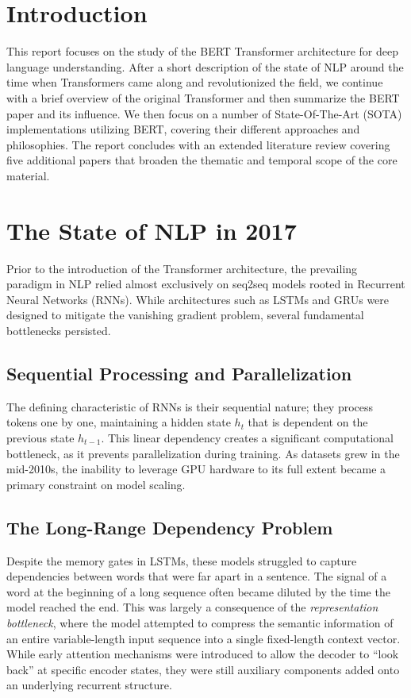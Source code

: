 \documentclass[a4paper,12pt]{article}
\begin{document}

\newpage
\tableofcontents

\clearpage
\section{Introduction}
This report focuses on the study of the BERT Transformer architecture for deep language understanding. After a short description of the state of NLP around the time when Transformers came along and revolutionized the field, we continue with a brief overview of the original Transformer \citep{vaswani2017attention} and then summarize the BERT paper \citep{devlin2019bert} and its influence. We then focus on a number of State-Of-The-Art (SOTA) implementations utilizing BERT, covering their different approaches and philosophies. The report concludes with an extended literature review covering five additional papers that broaden the thematic and temporal scope of the core material.

\section{The State of NLP in 2017}
Prior to the introduction of the Transformer architecture, the prevailing paradigm in NLP relied almost exclusively on seq2seq models rooted in Recurrent Neural Networks (RNNs). While architectures such as LSTMs \citep{hochreiter1997long} and GRUs were designed to mitigate the vanishing gradient problem, several fundamental bottlenecks persisted.

\subsection{Sequential Processing and Parallelization}
The defining characteristic of RNNs is their sequential nature; they process tokens one by one, maintaining a hidden state $h_t$ that is dependent on the previous state $h_{t-1}$. This linear dependency creates a significant computational bottleneck, as it prevents parallelization during training. As datasets grew in the mid-2010s, the inability to leverage GPU hardware to its full extent became a primary constraint on model scaling.

\subsection{The Long-Range Dependency Problem}
Despite the memory gates in LSTMs, these models struggled to capture dependencies between words that were far apart in a sentence. The signal of a word at the beginning of a long sequence often became diluted by the time the model reached the end. This was largely a consequence of the \textit{representation bottleneck}, where the model attempted to compress the semantic information of an entire variable-length input sequence into a single fixed-length context vector. While early attention mechanisms \citep{bahdanau2014neural} were introduced to allow the decoder to ``look back'' at specific encoder states, they were still auxiliary components added onto an underlying recurrent structure.
\end{document}
